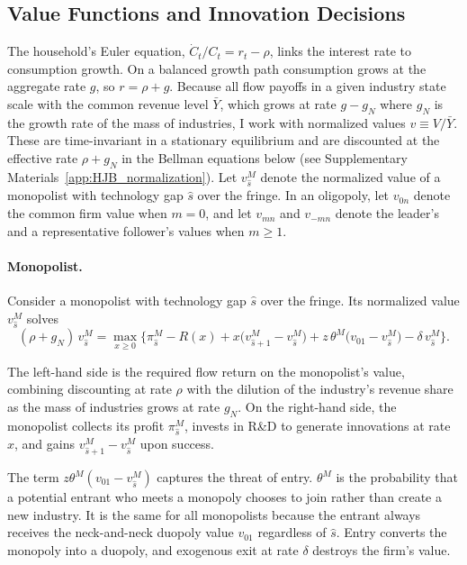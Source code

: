 \documentclass[12pt]{article}
\begin{document}
\subsection{Value Functions and Innovation Decisions}\label{subsec:value}

The household's Euler equation, \(\dot{C}_t/C_t = r_t - \rho\), links the interest rate to consumption growth. On a balanced growth path consumption grows at the aggregate rate \(g\), so \(r = \rho + g\). Because all flow payoffs in a given industry state scale with the common revenue level \(\bar{Y}\), which grows at rate \(g-g_N\) where \(g_N\) is the growth rate of the mass of industries, I work with normalized values \(v \equiv V/\bar{Y}\). These are time-invariant in a stationary equilibrium and are discounted at the effective rate \(\rho+g_N\) in the Bellman equations below (see Supplementary Materials~\ref{app:HJB_normalization}). Let \(v^M_{\hat{s}}\) denote the normalized value of a monopolist with technology gap \(\hat{s}\) over the fringe. In an oligopoly, let \(v_{0n}\) denote the common firm value when \(m=0\), and let \(v_{mn}\) and \(v_{-mn}\) denote the leader's and a representative follower's values when \(m\geq1\).

\paragraph{Monopolist.}

Consider a monopolist with technology gap \(\hat{s}\) over the fringe. Its normalized value \(v^M_{\hat{s}}\) solves
\begin{equation}
(\rho + g_N)\,v^M_{\hat{s}} = \max_{x \ge 0} \Big\{\pi^M_{\hat{s}}
                             - R(x)+x\big(v^M_{\hat{s}+1}
                             - v^M_{\hat{s}}\big)+z\,\theta^M\big(v_{01}
                             - v^M_{\hat{s}}\big)
                             - \delta\,v^M_{\hat{s}} \Big\}. \label{eq:valueM}
\end{equation}

The left-hand side is the required flow return on the monopolist's value, combining discounting at rate \(\rho\) with the dilution of the industry's revenue share as the mass of industries grows at rate \(g_N\). On the right-hand side, the monopolist collects its profit \(\pi^M_{\hat{s}}\), invests in R\&D to generate innovations at rate \(x\), and gains \(v^M_{\hat{s}+1} - v^M_{\hat{s}}\) upon success.

The term \(z\theta^M(v_{01} - v^M_{\hat{s}})\) captures the threat of entry. \(\theta^M\) is the probability that a potential entrant who meets a monopoly chooses to join rather than create a new industry. It is the same for all monopolists because the entrant always receives the neck-and-neck duopoly value \(v_{01}\) regardless of \(\hat{s}\). Entry converts the monopoly into a duopoly, and exogenous exit at rate \(\delta\) destroys the firm's value.
\end{document}
